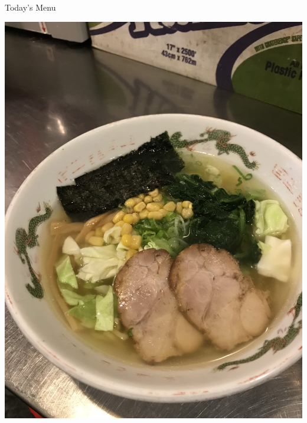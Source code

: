 \documentclass{beamer}
\begin{document}
\begin{frame}{Today's Menu}
\begin{minipage}[t]{0.35\textwidth}
        \includegraphics[width=.9\textwidth]{ramen2.jpg}
    \end{minipage}
\end{frame}

\end{document}
